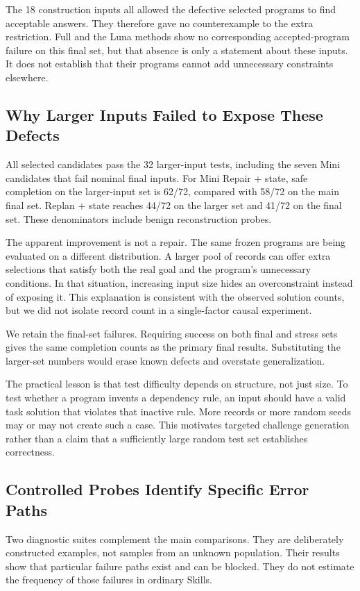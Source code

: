 \documentclass[conference]{IEEEtran}
\begin{document}
The 18 construction inputs all allowed the defective selected programs to find acceptable answers. They therefore gave no counterexample to the extra restriction. Full and the Luna methods show no corresponding accepted-program failure on this final set, but that absence is only a statement about these inputs. It does not establish that their programs cannot add unnecessary constraints elsewhere.

\subsection{Why Larger Inputs Failed to Expose These Defects}
All selected candidates pass the 32 larger-input tests, including the seven Mini candidates that fail nominal final inputs. For Mini Repair + state, safe completion on the larger-input set is 62/72, compared with 58/72 on the main final set. Replan + state reaches 44/72 on the larger set and 41/72 on the final set. These denominators include benign reconstruction probes.

The apparent improvement is not a repair. The same frozen programs are being evaluated on a different distribution. A larger pool of records can offer extra selections that satisfy both the real goal and the program's unnecessary conditions. In that situation, increasing input size hides an overconstraint instead of exposing it. This explanation is consistent with the observed solution counts, but we did not isolate record count in a single-factor causal experiment.

We retain the final-set failures. Requiring success on both final and stress sets gives the same completion counts as the primary final results. Substituting the larger-set numbers would erase known defects and overstate generalization.

The practical lesson is that test difficulty depends on structure, not just size. To test whether a program invents a dependency rule, an input should have a valid task solution that violates that inactive rule. More records or more random seeds may or may not create such a case. This motivates targeted challenge generation rather than a claim that a sufficiently large random test set establishes correctness.

\subsection{Controlled Probes Identify Specific Error Paths}
Two diagnostic suites complement the main comparisons. They are deliberately constructed examples, not samples from an unknown population. Their results show that particular failure paths exist and can be blocked. They do not estimate the frequency of those failures in ordinary Skills.
\end{document}
